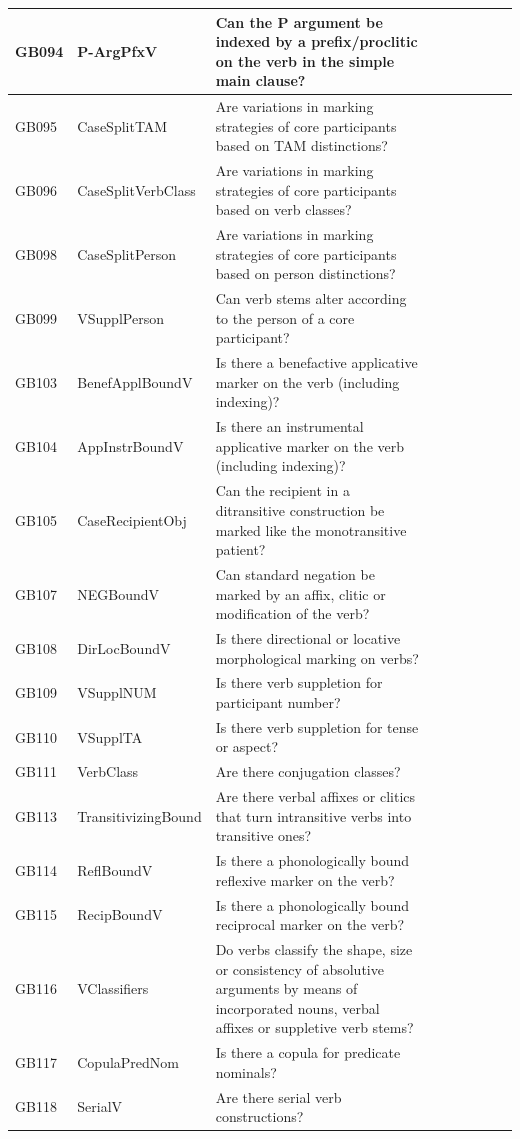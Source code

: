 \documentclass[a4paper,10pt]{article} %
\begin{document}
\begin{landscape}
\begin{longtable}{| l | p{4cm}| p{12cm}|p{2cm}|p{2cm}|p{2cm}|p{2cm}|p{2cm}|p{2cm}|}
GB094 & P-ArgPfxV&Can the P argument be indexed by a prefix/proclitic on the verb in the simple main clause?\\ \hline
GB095 & CaseSplitTAM&Are variations in marking strategies of core participants based on TAM distinctions?\\ \hline
GB096 & CaseSplitVerbClass&Are variations in marking strategies of core participants based on verb classes?\\ \hline
GB098 & CaseSplitPerson&Are variations in marking strategies of core participants based on person distinctions?\\ \hline
GB099 & VSupplPerson&Can verb stems alter according to the person of a core participant?\\ \hline
GB103 & BenefApplBoundV&Is there a benefactive applicative marker on the verb (including indexing)?\\ \hline
GB104 & AppInstrBoundV&Is there an instrumental applicative marker on the verb (including indexing)?\\ \hline
GB105 & CaseRecipientObj&Can the recipient in a ditransitive construction be marked like the monotransitive patient?\\ \hline
GB107 & NEGBoundV&Can standard negation be marked by an affix, clitic or modification of the verb?\\ \hline
GB108 & DirLocBoundV&Is there directional or locative morphological marking on verbs?\\ \hline
GB109 & VSupplNUM&Is there verb suppletion for participant number?\\ \hline
GB110 & VSupplTA&Is there verb suppletion for tense or aspect?\\ \hline
GB111 & VerbClass&Are there conjugation classes?\\ \hline
GB113 & TransitivizingBound&Are there verbal affixes or clitics that turn intransitive verbs into transitive ones?\\ \hline
GB114 & ReflBoundV&Is there a phonologically bound reflexive marker on the verb?\\ \hline
GB115 & RecipBoundV&Is there a phonologically bound reciprocal marker on the verb?\\ \hline
GB116 & VClassifiers&Do verbs classify the shape, size or consistency of absolutive arguments by means of incorporated nouns, verbal affixes or suppletive verb stems?\\ \hline
GB117 & CopulaPredNom&Is there a copula for predicate nominals?\\ \hline
GB118 & SerialV&Are there serial verb constructions?\\ \hline

\end{longtable}
\end{landscape}
\end{document}
